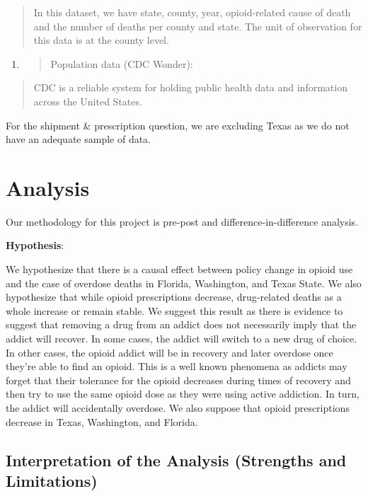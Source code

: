\documentclass{article}
\begin{document}
\begin{quote}
In this dataset, we have state, county, year, opioid-related cause of
death and the number of deaths per county and state. The unit of
observation for this data is at the county level.
\end{quote}

\begin{enumerate}
\def\labelenumi{\arabic{enumi}.}
\setcounter{enumi}{2}
\item
  \begin{quote}
  Population data (CDC Wonder):
  \end{quote}
\end{enumerate}

\begin{quote}
CDC is a reliable system for holding public health data and information
across the United States.
\end{quote}

For the shipment \& prescription question, we are excluding Texas as we
do not have an adequate sample of data.

\section{Analysis}

Our methodology for this project is pre-post and
difference-in-difference analysis.

\textbf{Hypothesis}:

We hypothesize that there is a causal effect between policy change in
opioid use and the case of overdose deaths in Florida, Washington, and
Texas State. We also hypothesize that while opioid prescriptions
decrease, drug-related deaths as a whole increase or remain stable. We
suggest this result as there is evidence to suggest that removing a drug
from an addict does not necessarily imply that the addict will recover.
In some cases, the addict will switch to a new drug of choice. In other
cases, the opioid addict will be in recovery and later overdose once
they're able to find an opioid. This is a well known phenomena as
addicts may forget that their tolerance for the opioid decreases during
times of recovery and then try to use the same opioid dose as they were
using active addiction. In turn, the addict will accidentally overdose.
We also suppose that opioid prescriptions decrease in Texas, Washington,
and Florida.

\hypertarget{interpretation-of-the-analysis-strengths-and-limitations}{%
\subsection{Interpretation of the Analysis (Strengths and
Limitations)}\label{interpretation-of-the-analysis-strengths-and-limitations}}
\end{document}
